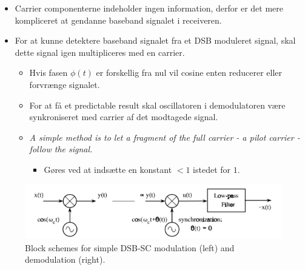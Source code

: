 \begin{itemize}
	\item Carrier componenterne indeholder ingen information, derfor er det mere kompliceret at gendanne baseband signalet i receiveren.
	\item For at kunne detektere baseband signalet fra et DSB moduleret
	signal, skal dette signal igen multipliceres med en carrier.
	\begin{itemize}
		\item  Hvis fasen $\phi(t)$ er forskellig fra nul vil
		cosine enten reducerer eller forvrænge signalet.
		\item For at få et predictable result skal oscillatoren i demodulatoren være  synkroniseret med carrier af det modtagede signal. 
		\item \textit{A simple method is to let a fragment of the full carrier - a pilot carrier - follow the signal.}
		\begin{itemize}
			\item Gøres ved at indsætte en konstant $<1$ istedet for $1$.
		\end{itemize}
	\end{itemize}
\end{itemize}

\begin{figure} [H]
	\centering
	\includegraphics[width=\linewidth]{graphics/7.png}
	\caption{ Block schemes for simple DSB-SC modulation (left) and demodulation (right).}
	\label{fig:7}
\end{figure}
